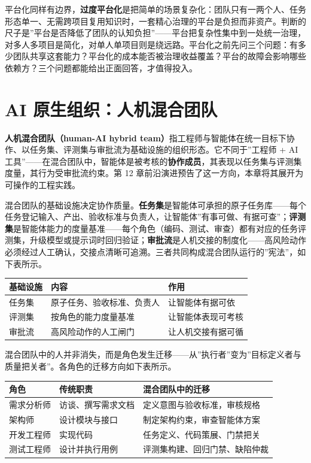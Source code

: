 \documentclass[
]{ctexbook}
\newcounter{none}
\begin{document}
平台化同样有边界，\textbf{过度平台化}是把简单的场景复杂化：团队只有一两个人、任务形态单一、无需跨项目复用知识时，一套精心治理的平台是负担而非资产。判断的尺子是''平台是否降低了团队的认知负担''------平台把复杂性集中到一处统一治理，对多人多项目是简化，对单人单项目则是绕远路。平台化之前先问三个问题：有多少团队共享这套能力？平台化的成本能否被治理收益覆盖？平台的故障会影响哪些依赖方？三个问题都能给出正面回答，才值得投入。

\section{AI
原生组织：人机混合团队}\label{ai-ux539fux751fux7ec4ux7ec7ux4ebaux673aux6df7ux5408ux56e2ux961f}

\textbf{人机混合团队（human-AI hybrid
team）}指工程师与智能体在统一目标下协作、以任务集、评测集与审批流为基础设施的组织形态。它不同于''工程师
+ AI
工具''------在混合团队中，智能体是被考核的\textbf{协作成员}，其表现以任务集与评测集度量，其行为受审批流约束。第
12 章前沿演进预告了这一方向，本章将其展开为可操作的工程实践。

混合团队的基础设施决定协作质量。\textbf{任务集}是智能体可承担的原子任务库------每个任务登记输入、产出、验收标准与负责人，让智能体''有事可做、有据可查''；\textbf{评测集}是智能体能力的度量基准------每个角色（编码、测试、审查）都有对应的任务评测集，升级模型或提示词时回归验证；\textbf{审批流}是人机交接的制度化------高风险动作必须经过人工确认，交接点清晰可追溯。三者共同构成混合团队运行的''宪法''，如下表所示。

{\def\LTcaptype{none} %
\begin{longtable}[]{@{}lll@{}}
\toprule\noalign{}
基础设施 & 内容 & 作用 \\
\midrule\noalign{}
\endhead
\bottomrule\noalign{}
\endlastfoot
任务集 & 原子任务、验收标准、负责人 & 让智能体有据可依 \\
评测集 & 按角色的能力度量基准 & 让智能体表现可考核 \\
审批流 & 高风险动作的人工闸门 & 让人机交接有据可循 \\
\end{longtable}
}

混合团队中的人并非消失，而是角色发生迁移------从''执行者''变为''目标定义者与质量把关者''。各角色的迁移方向如下表所示。

{\def\LTcaptype{none} %
\begin{longtable}[]{@{}lll@{}}
\toprule\noalign{}
角色 & 传统职责 & 混合团队中的迁移 \\
\midrule\noalign{}
\endhead
\bottomrule\noalign{}
\endlastfoot
需求分析师 & 访谈、撰写需求文档 & 定义意图与验收标准，审核规格 \\
架构师 & 设计模块与接口 & 制定架构约束，审查智能体方案 \\
开发工程师 & 实现代码 & 任务定义、代码策展、门禁把关 \\
测试工程师 & 设计并执行用例 & 评测集构建、回归门禁、缺陷仲裁 \\
\end{longtable}
}
\end{document}
